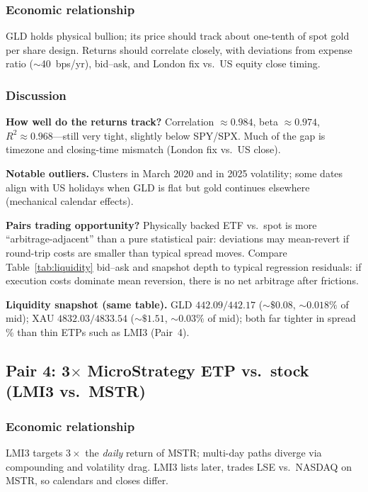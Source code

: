 \subsubsection*{Economic relationship}
GLD holds physical bullion; its price should track about one-tenth of spot gold per share design. Returns should correlate closely, with deviations from expense ratio ($\sim$40~bps/yr), bid--ask, and London fix vs.\ US equity close timing.


\subsubsection*{Discussion}

\textbf{How well do the returns track?}
Correlation $\approx 0.984$, beta $\approx 0.974$, $R^2 \approx 0.968$---still very tight, slightly below SPY/SPX. Much of the gap is timezone and closing-time mismatch (London fix vs.\ US close).

\textbf{Notable outliers.}
Clusters in March 2020 and in 2025 volatility; some dates align with US holidays when GLD is flat but gold continues elsewhere (mechanical calendar effects).

\textbf{Pairs trading opportunity?}
Physically backed ETF vs.\ spot is more ``arbitrage-adjacent'' than a pure statistical pair: deviations may mean-revert if round-trip costs are smaller than typical spread moves. Compare Table~\ref{tab:liquidity} bid--ask and snapshot depth to typical regression residuals: if execution costs dominate mean reversion, there is no net arbitrage after frictions.

\textbf{Liquidity snapshot (same table).}
GLD $442.09/442.17$ ($\sim\$0.08$, $\sim 0.018\%$ of mid); XAU $4832.03/4833.54$ ($\sim\$1.51$, $\sim 0.03\%$ of mid); both far tighter in spread \% than thin ETPs such as LMI3 (Pair~4).

\subsection{Pair 4: 3$\times$ MicroStrategy ETP vs.\ stock (LMI3 vs.\ MSTR)}
\label{subsec:pair4}

\subsubsection*{Economic relationship}
LMI3 targets $3\times$ the \emph{daily} return of MSTR; multi-day paths diverge via compounding and volatility drag. LMI3 lists later, trades LSE vs.\ NASDAQ on MSTR, so calendars and closes differ.

